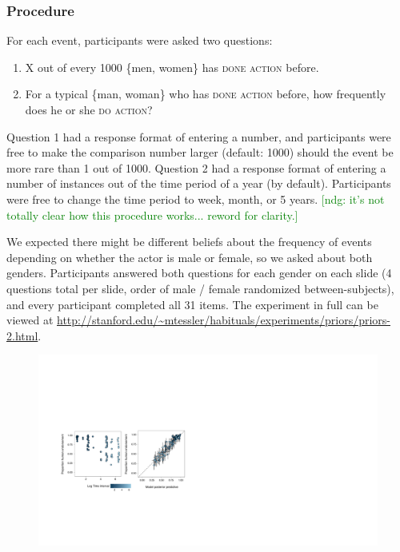 \documentclass[10pt,letterpaper]{article}
\newcommand{\ndg}[1]{\textcolor{Green}{[ndg: #1]}}
\begin{document}
\subsubsection{Procedure}

For each event, participants were asked two questions:
\begin{enumerate}
\item X out of every 1000 \{men, women\} has \textsc{done action} before.
\item For a typical \{man, woman\} who has \textsc{done action} before, how frequently does he or she \textsc{do action}? 
\end{enumerate}

Question 1 had a response format of entering a number, and participants were free to make the comparison number larger (default: 1000) should the event be more rare than 1 out of 1000.
Question 2 had a response format of entering a number of instances out of the time period of a year (by default). Participants were free to change the time period to week, month, or 5 years. \ndg{it's not totally clear how this procedure works... reword for clarity.}

We expected there might be different beliefs about the frequency of events depending on whether the actor is male or female, so we asked about both genders. Participants answered both questions for each gender on each slide (4 questions total per slide, order of male / female randomized between-subjects), and every participant completed all 31 items.
The experiment in full can be viewed at \url{http://stanford.edu/~mtessler/habituals/experiments/priors/priors-2.html}.

\begin{figure}[t]
\centering
  \includegraphics[width=\textwidth]{tj-scatters1}
  \caption{}
  \label{fig:tjScatters}
\end{figure}
\end{document}
